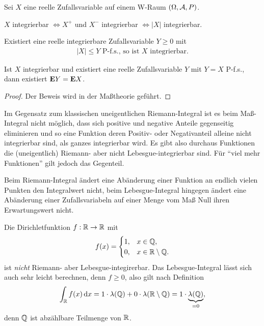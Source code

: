 \begin{prop}
\label{prop:4.1}
Sei $X$ eine reelle Zufallsvariable auf einem W-Raum $(\Omega, \AA, P)$.
\begin{propenum}
\item
$X$ integrierbar $\Leftrightarrow X^{+}$ und $X^{-}$ integrierbar
$\Leftrightarrow |X| $ integrierbar.
\item Existiert eine reelle integrierbare Zufallsvariable $Y \geq 0 $ mit
\begin{align*}
|X| \leq Y  \text{ P-f.s., so ist } X \text{ integrierbar}.
\end{align*}
\item
Ist $X$ integrierbar und  existiert eine reelle Zufallsvariable $Y$ mit
$Y = X$ P-f.s., dann existiert $\E Y = \E X $.\fishhere
\end{propenum}
\end{prop}
\begin{proof}
Der Beweis wird in der Maßtheorie geführt.\qedhere
\end{proof}

Im Gegensatz zum klassischen uneigentlichen Riemann-Integral ist es beim
Maß-Integral nicht möglich, dass sich positive und negative Anteile gegenseitig
eliminieren und so eine Funktion deren Positiv- oder Negativanteil alleine
nicht integrierbar sind, als ganzes integrierbar wird. Es gibt also durchaus
Funktionen die (uneigentlich) Riemann- aber nicht Lebesgue-integrierbar sind.
Für ``viel mehr Funktionen'' gilt jedoch das Gegenteil.

Beim Riemann-Integral ändert eine Abänderung einer Funktion an endlich vielen
Punkten den Integralwert nicht, beim Lebesgue-Integral hingegen ändert eine
Abänderung einer Zufallsvariabeln auf einer Menge vom Maß Null ihren
Erwartungswert nicht.

\begin{bsp}
Die Dirichletfunktion $f:\R\to\R$ mit
\begin{align*}
f(x) = 
\begin{cases}
1, & x\in \Q,\\
0, & x\in \R\setminus\Q.
\end{cases}
\end{align*}
ist \textit{nicht} Riemann- aber Lebesgue-integirerbar. Das Lebesgue-Integral
lässt sich auch sehr leicht berechnen, denn $f\ge 0$, also gilt nach Definition
\begin{align*}
\int_\R f(x)\dx = 1\cdot \lambda(\Q) + 0\cdot \lambda(\R\setminus\Q) = 1\cdot
\underbrace{\lambda(\Q)}_{=0},
\end{align*}
denn $\Q$ ist abzählbare Teilmenge von $\R$.\bsphere
\end{bsp}

